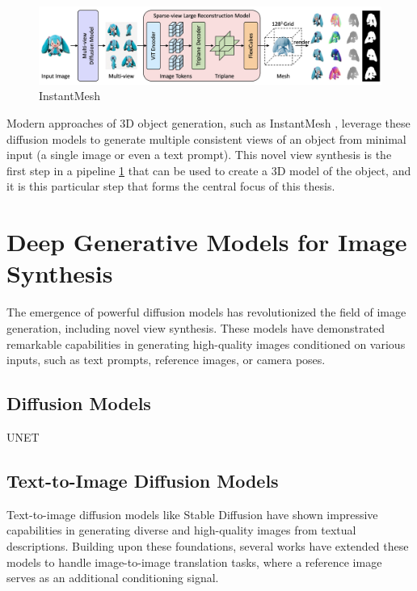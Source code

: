\begin{figure}[h]
  \centering
  \includegraphics[width=\textwidth]{images/related-work/instantmesh.png}
  \caption{InstantMesh}
  \label{fig:instantmesh}
\end{figure}

Modern approaches of 3D object generation, such as InstantMesh \cite{instantmesh}, leverage these diffusion models to generate multiple consistent views of an object from minimal input (a single image or even a text prompt). This novel view synthesis is the first step in a pipeline \ref{fig:instantmesh} that can be used to create a 3D model of the object, and it is this particular step that forms the central focus of this thesis.

\section{Deep Generative Models for Image Synthesis}\label{sec:text-to-image}

The emergence of powerful diffusion models has revolutionized the
field of image generation, including novel view synthesis. These
models have demonstrated remarkable capabilities in generating
high-quality images conditioned on various inputs, such as text
prompts, reference images, or camera poses.

\subsection{Diffusion Models}

UNET

\subsection{Text-to-Image Diffusion Models}

Text-to-image diffusion models like Stable Diffusion
\cite{stablediffusion} have shown impressive capabilities in
generating diverse and high-quality images from textual descriptions.
Building upon these foundations, several works have extended these
models to handle image-to-image translation tasks, where a reference
image serves as an additional conditioning signal.

